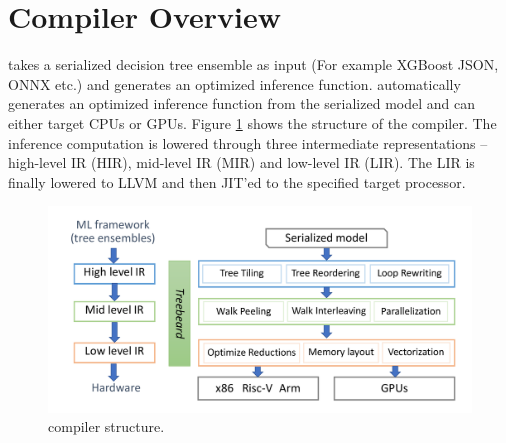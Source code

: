 \section{Compiler Overview}
\label{Sec:Overview}
\Treebeard{} takes a serialized decision tree ensemble as input (For example
XGBoost JSON, ONNX etc.) and generates an optimized inference function. 
\Treebeard{} automatically generates an optimized inference function from 
the serialized model and can either target CPUs or GPUs. 
Figure \ref{Fig:CompilerStructure} shows the structure of the \Treebeard{} compiler. 
The inference computation is lowered through three intermediate representations
-- high-level IR (HIR), mid-level IR (MIR) and low-level IR (LIR). The LIR is
finally lowered to LLVM and then JIT'ed to the specified target processor.

\begin{figure}[htb]
  \centering
  \includegraphics[width=\linewidth]{figures/compiler.png}
  \caption{\Treebeard{} compiler structure.}
  \label{Fig:CompilerStructure}
\end{figure}


